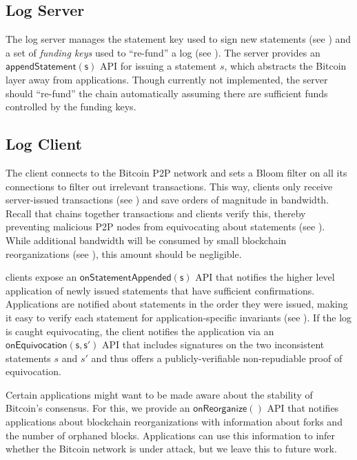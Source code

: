 \subsection{\Sys Log Server}
The log server manages the statement key used to sign new \Sys statements (see ) and a set of \emph{funding keys} used to ``re-fund'' a \Sys log (see ).
The server provides an $\mathsf{appendStatement(s)}$ API for issuing a statement $s$, which abstracts the Bitcoin layer away from applications.
Though currently not implemented, the server should ``re-fund'' the chain automatically assuming there are sufficient funds controlled by the funding keys.

\subsection{\Sys Log Client}
The client connects to the Bitcoin P2P network and sets a Bloom filter\cite{bloom} on all its connections to filter out irrelevant transactions.
This way, \Sys clients only receive server-issued \Sys transactions (see ) and save orders of magnitude in bandwidth.
Recall that \Sys chains together transactions and clients verify this, thereby preventing malicious P2P nodes from equivocating about statements (see ).
While additional bandwidth will be consumed by small blockchain reorganizations (see ), this amount should be negligible.

\Sys clients expose an $\mathsf{onStatementAppended(s)}$ API that notifies the higher level application of newly issued statements that have sufficient confirmations.
Applications are notified about statements in the order they were issued, making it easy to verify each statement for application-specific invariants (see ).
If the \Sys log is caught equivocating, the \Sys client notifies the application via an $\mathsf{onEquivocation(s,s')}$ API that includes signatures on the two inconsistent statements $s$ and $s'$ and thus offers a publicly-verifiable non-repudiable proof of equivocation.

Certain applications might want to be made aware about the stability of Bitcoin's consensus.
For this, we provide an $\mathsf{onReorganize()}$ API that notifies applications about blockchain reorganizations with information about forks and the number of orphaned blocks.
Applications can use this information to infer whether the Bitcoin network is under attack, but we leave this to future work.

